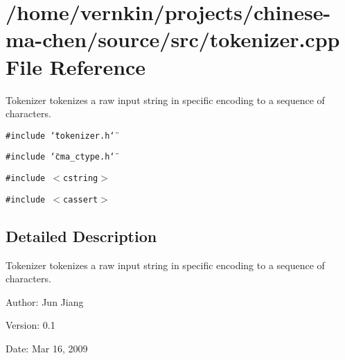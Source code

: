 \section{/home/vernkin/projects/chinese-ma-chen/source/src/tokenizer.cpp File Reference}
\label{tokenizer_8cpp}
Tokenizer tokenizes a raw input string in specific encoding to a sequence of characters.  


{\tt \#include \char`\"{}tokenizer.h\char`\"{}}\par
{\tt \#include \char`\"{}cma\_\-ctype.h\char`\"{}}\par
{\tt \#include $<$cstring$>$}\par
{\tt \#include $<$cassert$>$}\par


\subsection{Detailed Description}
Tokenizer tokenizes a raw input string in specific encoding to a sequence of characters. 

\begin{Desc}
\item[Author:]Jun Jiang \end{Desc}
\begin{Desc}
\item[Version:]0.1 \end{Desc}
\begin{Desc}
\item[Date:]Mar 16, 2009 \end{Desc}
